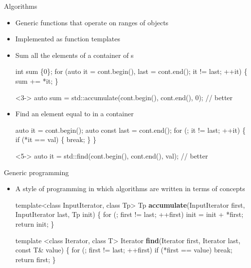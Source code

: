 \begin{frame}[fragile]{Algorithms}

  \begin{itemize}
  \item Generic functions that operate on \alert{ranges} of objects
  \item Implemented as function templates
  \end{itemize}

  \begin{itemize}
  \item<2-> Sum all the elements of a container  of s
    \begin{codeblock}
int sum \{0\};
for (auto it = cont.begin(), last = cont.end(); it != last; ++it) \{
  sum += *it;
\}\end{codeblock}

    \begin{codeblock}<3->{
auto sum = std::accumulate(cont.begin(), cont.end(), 0); // better}\end{codeblock}

  \item<4-> Find an element equal to  in a container 
    \begin{codeblock}
auto it = cont.begin();
auto const last = cont.end();
for (; it != last; ++it) \{
  if (*it == val) \{
    break;
  \}
\}\end{codeblock}

    \begin{codeblock}<5->{
auto it = std::find(cont.begin(), cont.end(), val); // better}\end{codeblock}

  \end{itemize}
\end{frame}

\begin{frame}[fragile]{Generic programming}

  \begin{itemize}
  \item A style of programming in which \alert{algorithms} are written
    in terms of \alert{concepts}

    \begin{codeblock}
template<class InputIterator, class Tp>
Tp \textbf{accumulate}(InputIterator first, InputIterator last, Tp init)
\{
    for (; first \alert{!=} last; \alert{++}first)
        init \alert{=} init \alert{+} \alert{*}first;
    return init;
\}\end{codeblock}

  \begin{codeblock}
template <class Iterator, class T>
Iterator \textbf{find}(Iterator first, Iterator last, const T\& value)
\{
  for (; first \alert{!=} last; \alert{++}first)
    if (\alert{*}first \alert{==} value) break;
  return first;
\}\end{codeblock}

\end{itemize}
\end{frame}

